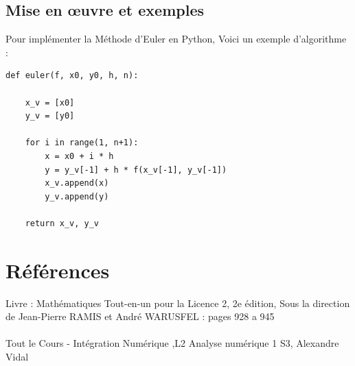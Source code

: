 \documentclass[12pt,a4paper]{article}
\begin{document}
\subsection{Mise en œuvre et exemples}

Pour implémenter la Méthode d'Euler en Python, Voici un exemple d'algorithme :
\begin{lstlisting}
def euler(f, x0, y0, h, n):

    x_v = [x0] 
    y_v = [y0]  
    
    for i in range(1, n+1):
        x = x0 + i * h
        y = y_v[-1] + h * f(x_v[-1], y_v[-1])
        x_v.append(x)
        y_v.append(y)
    
    return x_v, y_v

\end{lstlisting}

\newpage


\section{Références}
Livre : Mathématiques Tout-en-un pour la Licence 2, 2e édition, Sous la direction de Jean-Pierre RAMIS et André WARUSFEL : pages 928 a 945
\\
\\
Tout le Cours - Intégration Numérique ,L2 Analyse numérique 1 S3, Alexandre Vidal 
 
\end{document}
